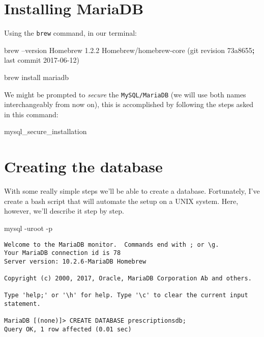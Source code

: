 \documentclass[english,a4paper,]{report}
\newenvironment{Shaded}{}{}
\newcommand{\KeywordTok}[1]{\textcolor[rgb]{0.00,0.44,0.13}{\textbf{#1}}}
\newcommand{\FunctionTok}[1]{\textcolor[rgb]{0.02,0.16,0.49}{#1}}
\newcommand{\ExtensionTok}[1]{#1}
\newcommand{\NormalTok}[1]{#1}
\begin{document}
\section{Installing MariaDB}\label{installing-mariadb}

Using the \texttt{brew} command, in our terminal:

\begin{Shaded}
\begin{Highlighting}[]
\ExtensionTok{brew}\NormalTok{ --version}
\ExtensionTok{Homebrew}\NormalTok{ 1.2.2}
\ExtensionTok{Homebrew/homebrew-core}\NormalTok{ (git revision 73a8655}\KeywordTok{;} \FunctionTok{last}\NormalTok{ commit 2017-06-12)}

\ExtensionTok{brew}\NormalTok{ install mariadb}
\end{Highlighting}
\end{Shaded}

We might be prompted to \emph{secure} the \texttt{MySQL/MariaDB} (we
will use both names interchangeably from now on), this is accomplished
by following the steps asked in this command:

\begin{Shaded}
\begin{Highlighting}[]
\ExtensionTok{mysql_secure_installation}
\end{Highlighting}
\end{Shaded}

\section{Creating the database}\label{creating-the-database}

With some really simple steps we'll be able to create a database.
Fortunately, I've create a bash script that will automate the setup on a
UNIX system. Here, however, we'll describe it step by step.

\begin{Shaded}
\begin{Highlighting}[]
\ExtensionTok{mysql}\NormalTok{ -uroot -p}
\end{Highlighting}
\end{Shaded}

\begin{verbatim}
Welcome to the MariaDB monitor.  Commands end with ; or \g.
Your MariaDB connection id is 78
Server version: 10.2.6-MariaDB Homebrew

Copyright (c) 2000, 2017, Oracle, MariaDB Corporation Ab and others.

Type 'help;' or '\h' for help. Type '\c' to clear the current input statement.

MariaDB [(none)]> CREATE DATABASE prescriptionsdb;
Query OK, 1 row affected (0.01 sec)
\end{verbatim}
\end{document}
